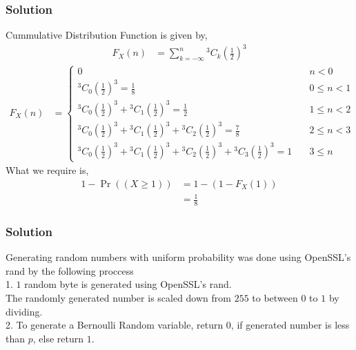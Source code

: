 \documentclass{beamer}
\providecommand{\pr}[1]{\ensuremath{\Pr\left(#1\right)}}
\providecommand{\brak}[1]{\ensuremath{\left(#1\right)}}
\theoremstyle{remark}
\numberwithin{equation}{section}
\begin{document}
      \begin{frame}
        \frametitle{Solution}
        Cummulative Distribution Function is given by,
        {\small
        \begin{align}
          F_X \brak{n} &= \sum _{k=-\infty}^{n} {}^3C_k \brak{\frac{1}{2}}^3 
        \end{align}
        \begin{align}
          F_{X}\brak{n} &= \begin{cases}
            0 & \quad n < 0\\
            {}^3C_0\brak{\frac{1}{2}}^3 = \frac{1}{8} & \quad 0 \leq n < 1\\
            {}^3C_0\brak{\frac{1}{2}}^3 +{}^3C_1\brak{\frac{1}{2}}^3 = \frac{1}{2} & \quad 1 \leq n < 2\\
            {}^3C_0\brak{\frac{1}{2}}^3 + {}^3C_1  \brak{\frac{1}{2}}^3 + {}^3C_2\brak{\frac{1}{2}}^3 = \frac{7}{8} & \quad 2 \leq n < 3\\
            {}^3C_0\brak{\frac{1}{2}}^3 + {}^3C_1  \brak{\frac{1}{2}}^3 + {}^3C_2\brak{\frac{1}{2}}^3 + {}^3C_3\brak{\frac{1}{2}}^3 = 1 & \quad 3 \leq n
          \end{cases}
        \end{align}
        }
        What we require is,
        {\small
        \begin{align}
          1 - \pr{\brak{X \ge 1}} &= 1 - \brak{1 - F_X\brak{1} } \\
          &= \frac{1}{8}
        \end{align} 
        }
      \end{frame}
      \begin{frame}
        \frametitle{Solution}
        Generating random numbers with uniform probability was done using OpenSSL's rand by the following proccess\\
        1. $1$ random byte is generated using OpenSSL's rand.\\ 
        The randomly generated number is scaled down from $255$ to between $0$ to $1$ by dividing.\\ 
        2. To generate a Bernoulli Random variable, return 0, if generated number is less than $p$, else return $1$.\\
      \end{frame}
\end{document}
